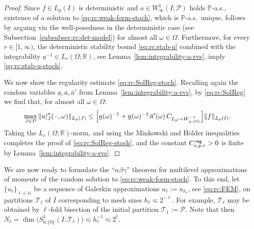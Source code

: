 \documentclass[reqno]{amsart}
\numberwithin{equation}{section}
\newcommand{\bbN}{\mathbb{N}}
\newcommand{\bbP}{\mathbb{P}}
\newcommand{\bbR}{\mathbb{R}}
\newcommand{\cP}{\mathcal{P}}
\newcommand{\cT}{\mathcal{T}}
\newcommand{\norm}[2]{     \| #1       \|_{ #2 }}
\theoremstyle{remark}
\theoremstyle{definition}
\begin{document}
\begin{proof} 
	Since $f\in L_p(I)$ is deterministic and 
	$a\in W^1_\infty(I;\cP)$ holds $\bbP$-a.s., 
	existence of a solution to \eqref{eq:rc:weak-form-stoch}, 
	which is $\bbP$-a.s.\ unique, 
	follows by arguing 
	via the well-posedness in the deterministic case 
	(see Subsection~\ref{subsubsec:rc:det-model})
	for almost all $\omega\in\Omega$. 
	Furthermore, for every $r\in[1,\infty)$, 
	the deterministic 
	stability bound \eqref{eq:rc:stab-u} combined 
	with the integrability 
	$\underline{a}^{-1}\in L_r(\Omega;\bbR)$, 
	see Lemma~\ref{lem:integrability-a-rvs}, 
	imply \eqref{eq:rc:stab-u-stoch}. 
	
	We now show the regularity estimate 
	\eqref{eq:rc:SolReg-stoch}. 
	Recalling again the random variables 
	$\underline{a},\overline{a},\overline{a}'$ 
	from Lemma~\ref{lem:integrability-a-rvs}, 
	by \eqref{eq:rc:SolReg} we find that, 
	for almost all $\omega\in\Omega$: 
	\[
	\max_{J\in\cP} 
	\norm{ u|_J''(\,\cdot\,, \omega) }{L_p(J)} 
	\leq 
	\Bigl[ \underline{a}(\omega)^{-1}
	+ \underline{a}(\omega)^{-2} \, \overline{a}'(\omega) 
	\, C_{L_p\to W^{-1}_{p,\{0\}}}
	\Bigr] 
	\norm{f}{L_p(I)} . 
	\]
	Taking the $L_r(\Omega;\bbR)$-norm, 
	and using the Minkowski and H\"older inequalities 
	completes the proof of \eqref{eq:rc:SolReg-stoch}, 
	and the constant $C_{a,p,r}^{\sf\, reg}>0$ 
	is finite by Lemma~\ref{lem:integrability-a-rvs}. 
\end{proof} 

We are now ready to formulate 
the ``$\alpha\beta\gamma$'' theorem 
for multilevel approximations of 
moments of the random solution 
to \eqref{eq:rc:weak-form-stoch}. 
%
To this end, let $\{ u_\ell \}_{\ell \in\bbN}$ 
be a sequence 
of Galerkin approximations 
$u_\ell := u_{h_\ell}$, see \eqref{eq:rc:FEM}, 
on partitions $\cT_\ell$ of $\overline{I}$ 
corresponding to mesh sizes $h_\ell \eqsim 2^{-\ell}$. 
For example, 
$\cT_\ell$ may be obtained 
by $\ell$-fold bisection 
of the initial partition $\cT_1 := \cP$. 
Note that then 
$N_\ell = 
\dim\bigl( S^1_{0,\{0\}}(I;\cT_\ell) \bigr) 
\eqsim h_\ell^{-1} \eqsim 2^\ell$. 
\end{document}
